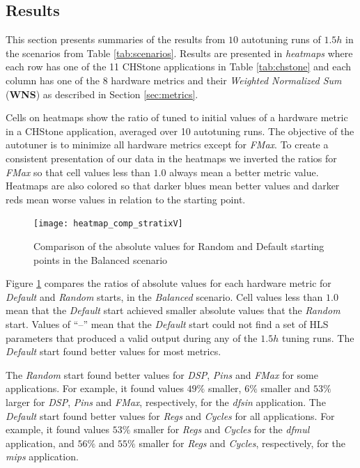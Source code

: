 \subsection{Results}
\label{sec:FPGAresults}


This section presents summaries of the results from $10$ autotuning runs of
$1.5h$ in the scenarios from Table \ref{tab:scenarios}.  Results are presented
in \textit{heatmaps} where each row has one of the 11 CHStone applications in
Table \ref{tab:chstone} and each column has one of the 8 hardware metrics and
their \textit{Weighted Normalized Sum} (\textbf{WNS}) as described in Section
\ref{sec:metrics}.

Cells on heatmaps show the ratio of tuned to initial values of a hardware
metric in a CHStone application, averaged over 10 autotuning runs. The
objective of the autotuner is to minimize all hardware metrics except for
\textit{FMax}.  To create a consistent presentation of our data in the heatmaps
we inverted the ratios for \textit{FMax} so that cell values less than $1.0$
always mean a better metric value.  Heatmaps are also colored so that darker
blues mean better values and darker reds mean worse values in relation to the
starting point.

\begin{figure}[htpb]
    \centering
    \texttt{[image: heatmap\_comp\_stratixV]}
    \caption{Comparison of the absolute values for Random and Default starting points in the Balanced scenario}
    \label{fig:comp}
\end{figure}

Figure \ref{fig:comp} compares the ratios of absolute values for each hardware
metric for \textit{Default} and \textit{Random} starts, in the
\textit{Balanced} scenario.  Cell values less than $1.0$ mean that the
\textit{Default} start achieved smaller absolute values that the
\textit{Random} start.  Values of ``--'' mean that the \textit{Default} start
could not find a set of HLS parameters that produced a valid output during any
of the $1.5h$ tuning runs. The \textit{Default} start found better values for
most metrics.

The \textit{Random} start found better values for \textit{DSP}, \textit{Pins}
and \textit{FMax} for some applications. For example, it found values $49\%$
smaller, $6\%$ smaller and $53\%$ larger for \textit{DSP}, \textit{Pins} and
\textit{FMax}, respectively, for the \textit{dfsin} application. The
\textit{Default} start found better values for \textit{Regs} and
\textit{Cycles} for all applications. For example, it found values $53\%$
smaller for \textit{Regs} and \textit{Cycles} for the \textit{dfmul}
application, and $56\%$ and $55\%$ smaller for \textit{Regs} and
\textit{Cycles}, respectively, for the \textit{mips} application.

